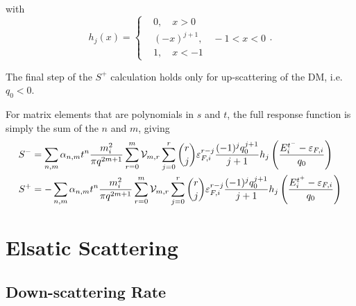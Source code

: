 with 
\begin{equation}
    h_j(x) = \begin{cases}
        & 0, \quad x >0\\
        & (-x)^{j+1},\quad -1<x <0\\
        & 1,\quad x<-1
    \end{cases}.
\end{equation}

The final step of the $S^+$ calculation holds only for up-scattering of the DM, i.e. $q_0<0$.

For matrix elements that are polynomials in $s$ and $t$, the full response function is simply the sum of the $n$ and $m$, giving
\begin{align}
    S^- & = \sum_{n,m}\alpha_{n,m} t^n \frac{m_i^2}{\pi q^{2m + 1}}\sum_{r=0}^m \mathcal{V}_{m,r} \sum_{j = 0}^r \binom{r}{j} \varepsilon_{F,i}^{r-j}  \frac{(-1)^{j} q_0^{j+1}}{j+1} h_j\left( \frac{E_i^{t^-} - \varepsilon_{F,i}}{q_0}\right)\\
    S^+ & = -\sum_{n,m}\alpha_{n,m} t^n \frac{m_i^2}{\pi q^{2m + 1}}\sum_{r=0}^m \mathcal{V}_{m,r} \sum_{j = 0}^r \binom{r}{j} \varepsilon_{F,i}^{r-j}  \frac{(-1)^{j} q_0^{j+1}}{j+1} h_j\left( \frac{E_i^{t^+} - \varepsilon_{F,i}}{q_0}\right)
\end{align}

\section{Elsatic Scattering}
\label{app:sec:elastic_scatter_full}

\subsection{Down-scattering Rate}
\label{app:subsec:down_scatter_derivation}

